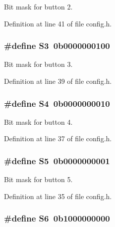 Bit mask for button 2. 



Definition at line 41 of file config.\+h.

\subsubsection[{\texorpdfstring{S3}{S3}}]{\setlength{\rightskip}{0pt plus 5cm}\#define S3~0b0000000100}\hypertarget{group__buttons_gab29872af8ce9dc9463b7f7ecfbea02ae}{}\label{group__buttons_gab29872af8ce9dc9463b7f7ecfbea02ae}


Bit mask for button 3. 



Definition at line 39 of file config.\+h.

\subsubsection[{\texorpdfstring{S4}{S4}}]{\setlength{\rightskip}{0pt plus 5cm}\#define S4~0b0000000010}\hypertarget{group__buttons_gac6dd50ea82e237280daf26bd9b562ba9}{}\label{group__buttons_gac6dd50ea82e237280daf26bd9b562ba9}


Bit mask for button 4. 



Definition at line 37 of file config.\+h.

\subsubsection[{\texorpdfstring{S5}{S5}}]{\setlength{\rightskip}{0pt plus 5cm}\#define S5~0b0000000001}\hypertarget{group__buttons_ga0dae655e00097db2f5737cef9f1fe1e6}{}\label{group__buttons_ga0dae655e00097db2f5737cef9f1fe1e6}


Bit mask for button 5. 



Definition at line 35 of file config.\+h.

\subsubsection[{\texorpdfstring{S6}{S6}}]{\setlength{\rightskip}{0pt plus 5cm}\#define S6~0b1000000000}\hypertarget{group__buttons_gab86bfbee3d71830e88c61a3f8d5aebf4}{}\label{group__buttons_gab86bfbee3d71830e88c61a3f8d5aebf4}


